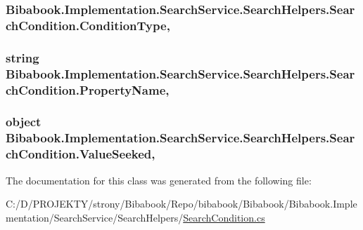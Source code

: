 \subsubsection[{Condition\+Type}]{ Bibabook.\+Implementation.\+Search\+Service.\+Search\+Helpers.\+Search\+Condition.\+Condition\+Type\hspace{0.3cm}{\ttfamily [get]}, {\ttfamily [set]}}\label{class_bibabook_1_1_implementation_1_1_search_service_1_1_search_helpers_1_1_search_condition_ad687a38f2ac1b652ba4f621fa3bbd983}
\hypertarget{class_bibabook_1_1_implementation_1_1_search_service_1_1_search_helpers_1_1_search_condition_a27ffc146a7b383bc22fddd9038b19535}{}
\subsubsection[{Property\+Name}]{\setlength{\rightskip}{0pt plus 5cm}string Bibabook.\+Implementation.\+Search\+Service.\+Search\+Helpers.\+Search\+Condition.\+Property\+Name\hspace{0.3cm}{\ttfamily [get]}, {\ttfamily [set]}}\label{class_bibabook_1_1_implementation_1_1_search_service_1_1_search_helpers_1_1_search_condition_a27ffc146a7b383bc22fddd9038b19535}
\hypertarget{class_bibabook_1_1_implementation_1_1_search_service_1_1_search_helpers_1_1_search_condition_a03fb0b6daa71f2dc653180d8618bf4ae}{}
\subsubsection[{Value\+Seeked}]{\setlength{\rightskip}{0pt plus 5cm}object Bibabook.\+Implementation.\+Search\+Service.\+Search\+Helpers.\+Search\+Condition.\+Value\+Seeked\hspace{0.3cm}{\ttfamily [get]}, {\ttfamily [set]}}\label{class_bibabook_1_1_implementation_1_1_search_service_1_1_search_helpers_1_1_search_condition_a03fb0b6daa71f2dc653180d8618bf4ae}


The documentation for this class was generated from the following file\+:\begin{DoxyCompactItemize}
\item 
C\+:/\+D/\+P\+R\+O\+J\+E\+K\+T\+Y/strony/\+Bibabook/\+Repo/bibabook/\+Bibabook/\+Bibabook.\+Implementation/\+Search\+Service/\+Search\+Helpers/\hyperlink{_search_condition_8cs}{Search\+Condition.\+cs}\end{DoxyCompactItemize}
